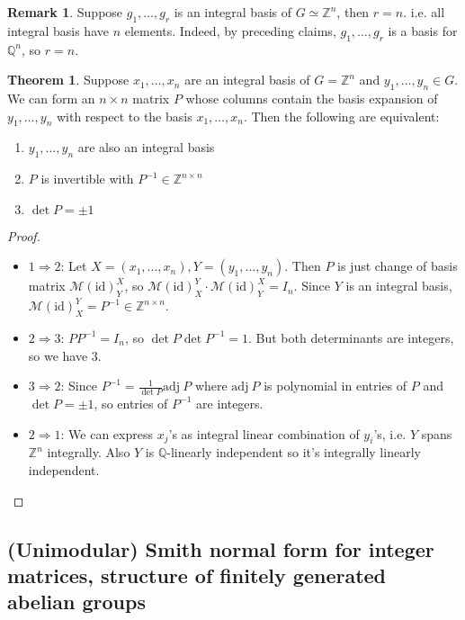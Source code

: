 \documentclass[a4paper]{article}
\newcommand{\adj}{\text{adj}\ }
\theoremstyle{definition}
\newtheorem{thm}[defn]{Theorem}
\newtheorem*{remark}{Remark}
\begin{document}
\begin{remark}
Suppose $g_1,\ldots,g_r$ is an integral basis of $G \simeq \mathbb Z^n$, then $r=n$. i.e. all integral basis have $n$ elements. Indeed, by preceding claims, $g_1,\ldots,g_r$ is a basis for $\mathbb Q^n$, so $r=n$.
\end{remark}
\begin{thm}
Suppose $x_1,\ldots,x_n$ are an integral basis of $G=\mathbb Z^n$ and $y_1,\ldots,y_n \in G$. We can form an $n\times n$ matrix $P$ whose columns contain the basis expansion of $y_1,\ldots,y_n$ with respect to the basis $x_1,\ldots,x_n$. Then the following are equivalent:
\begin{enumerate}
    \item $y_1,\ldots,y_n$ are also an integral basis
    \item $P$ is invertible with $P^{-1} \in \mathbb Z^{n\times n}$
    \item $\det P = \pm 1$
\end{enumerate}
\end{thm}
\begin{proof}
\begin{itemize}
    \item $1\Rightarrow 2$: Let $X=(x_1,\ldots,x_n),Y=(y_1,\ldots,y_n)$. Then $P$ is just change of basis matrix $\mathcal M(\text{id})_Y^X$, so $\mathcal M(\text{id})_X^Y\cdot \mathcal M(\text{id})_Y^X=I_n$. Since $Y$ is an integral basis, $\mathcal M(\text{id})_X^Y=P^{-1}\in \mathbb Z^{n\times n}$.
    \item $2\Rightarrow 3$: $PP^{-1}=I_n$, so $\det P \det P^{-1}=1$. But both determinants are integers, so we have 3.
    \item $3\Rightarrow 2$: Since $P^{-1} = \frac{1}{\det P} \adj P$ where $\adj P$ is polynomial in entries of $P$ and $\det P=\pm 1$, so entries of $P^{-1}$ are integers.
    \item $2\Rightarrow 1$: We can express $x_j$'s as integral linear combination of $y_i$'s, i.e. $Y$ spans $\mathbb Z^n$ integrally. Also $Y$ is $\mathbb Q$-linearly independent so it's integrally linearly independent.
\end{itemize}
\end{proof}
\subsection{(Unimodular) Smith normal form for integer matrices, structure of finitely generated abelian groups}
\end{document}
